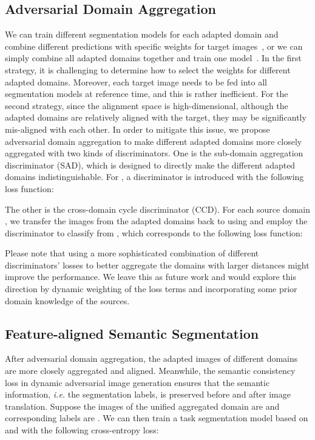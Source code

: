 \documentclass{article}
\begin{document}
\subsection{Adversarial Domain Aggregation}
We can train different segmentation models for each adapted domain and combine different predictions with specific weights for target images~\cite{xu2018deep,peng2018moment}, or we can simply combine all adapted domains together and train one model~\cite{zhao2018adversarial}. In the first strategy, it is challenging to determine how to select the weights for different adapted domains. Moreover, each target image needs to be fed into all segmentation models at reference time, and this is rather inefficient. For the second strategy, since the alignment space is high-dimensional, although the adapted domains are relatively aligned with the target, they may be significantly mis-aligned with each other. In order to mitigate this issue, we propose adversarial domain aggregation to make different adapted domains more closely aggregated with two kinds of discriminators. One is the sub-domain aggregation discriminator (SAD), which is designed to directly make the different adapted domains indistinguishable. For , a discriminator  is introduced with the following loss function:

The other is the cross-domain cycle discriminator (CCD). For each source domain , we transfer the images from the adapted domains  back to  using  and employ the discriminator  to classify  from , which corresponds to the following loss function:

Please note that using a more sophisticated combination of different discriminators' losses to better aggregate the domains with larger distances might improve the performance. We leave this as future work and would explore this direction by dynamic weighting of the loss terms and incorporating some prior domain knowledge of the sources.


\subsection{Feature-aligned Semantic Segmentation} After adversarial domain aggregation, the adapted images of different domains  are more closely aggregated and aligned. Meanwhile, the semantic consistency loss in dynamic adversarial image generation ensures that the semantic information, \textit{i.e.} the segmentation labels, is preserved before and after image translation. Suppose the images of the unified aggregated domain are  and corresponding labels are
. We can then train a task segmentation model  based on  and  with the following cross-entropy loss:
\end{document}

